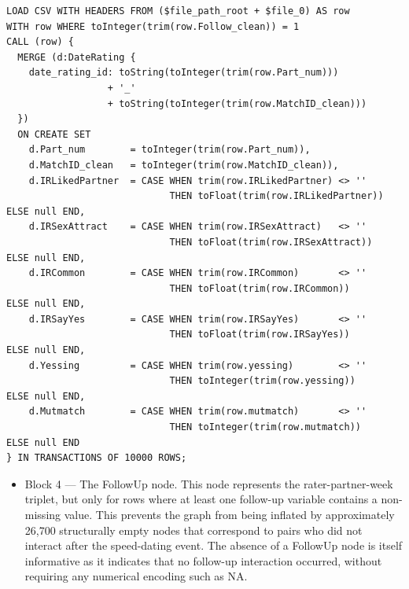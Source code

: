 \documentclass[sn-apa,pdflatex]{sn-jnl}
\theoremstyle{remark}
\theoremstyle{definition}
\providecommand{\tightlist}{%
  \setlength{\itemsep}{0pt}\setlength{\parskip}{0pt}}
\begin{document}
\begin{verbatim}
LOAD CSV WITH HEADERS FROM ($file_path_root + $file_0) AS row
WITH row WHERE toInteger(trim(row.Follow_clean)) = 1
CALL (row) {
  MERGE (d:DateRating {
    date_rating_id: toString(toInteger(trim(row.Part_num)))
                  + '_'
                  + toString(toInteger(trim(row.MatchID_clean)))
  })
  ON CREATE SET
    d.Part_num        = toInteger(trim(row.Part_num)),
    d.MatchID_clean   = toInteger(trim(row.MatchID_clean)),
    d.IRLikedPartner  = CASE WHEN trim(row.IRLikedPartner) <> ''
                             THEN toFloat(trim(row.IRLikedPartner)) ELSE null END,
    d.IRSexAttract    = CASE WHEN trim(row.IRSexAttract)   <> ''
                             THEN toFloat(trim(row.IRSexAttract))   ELSE null END,
    d.IRCommon        = CASE WHEN trim(row.IRCommon)       <> ''
                             THEN toFloat(trim(row.IRCommon))       ELSE null END,
    d.IRSayYes        = CASE WHEN trim(row.IRSayYes)       <> ''
                             THEN toFloat(trim(row.IRSayYes))       ELSE null END,
    d.Yessing         = CASE WHEN trim(row.yessing)        <> ''
                             THEN toInteger(trim(row.yessing))      ELSE null END,
    d.Mutmatch        = CASE WHEN trim(row.mutmatch)       <> ''
                             THEN toInteger(trim(row.mutmatch))     ELSE null END
} IN TRANSACTIONS OF 10000 ROWS;
\end{verbatim}

\begin{itemize}
\tightlist
\item
  Block 4 --- The FollowUp node. This node represents the
  rater-partner-week triplet, but only for rows where at least one
  follow-up variable contains a non-missing value. This prevents the
  graph from being inflated by approximately 26,700 structurally empty
  nodes that correspond to pairs who did not interact after the
  speed-dating event. The absence of a FollowUp node is itself
  informative as it indicates that no follow-up interaction occurred,
  without requiring any numerical encoding such as NA.
\end{itemize}
\end{document}

